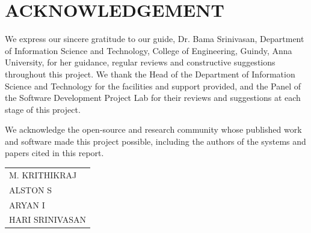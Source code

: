 \chapter*{\uppercase{ACKNOWLEDGEMENT}}
We express our sincere gratitude to our guide, Dr. Bama Srinivasan, Department
of Information Science and Technology, College of Engineering, Guindy, Anna
University, for her guidance, regular reviews and constructive suggestions throughout
this project. We thank the Head of the Department of Information Science and Technology for the
facilities and support provided, and the Panel of the Software Development Project Lab for
their reviews and suggestions at each stage of this project.

We acknowledge the open-source and research community whose published
work and software made this project possible, including the authors of the systems and
papers cited in this report.

\vspace{1cm}
\begin{flushright}
\begin{tabular}{l}
M. KRITHIKRAJ \\
ALSTON S \\
ARYAN I \\
HARI SRINIVASAN
\end{tabular}
\end{flushright}
